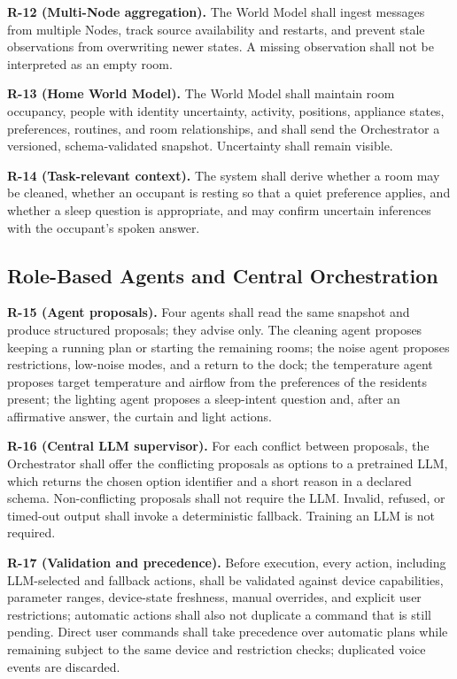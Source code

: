 \documentclass[conference]{IEEEtran}
\begin{document}
\textbf{R-12 (Multi-Node aggregation).}
The World Model shall ingest messages from multiple Nodes, track
source availability and restarts, and prevent stale observations
from overwriting newer states. A missing observation shall not be
interpreted as an empty room.

\textbf{R-13 (Home World Model).}
The World Model shall maintain room occupancy, people with
identity uncertainty, activity, positions, appliance states,
preferences, routines, and room relationships, and shall send the
Orchestrator a versioned, schema-validated snapshot. Uncertainty
shall remain visible.

\textbf{R-14 (Task-relevant context).}
The system shall derive whether a room may be cleaned, whether an
occupant is resting so that a quiet preference applies, and whether
a sleep question is appropriate, and may confirm uncertain
inferences with the occupant's spoken answer.

\subsection{Role-Based Agents and Central Orchestration}

\textbf{R-15 (Agent proposals).}
Four agents shall read the same snapshot and produce structured
proposals; they advise only. The cleaning agent proposes keeping a
running plan or starting the remaining rooms; the noise agent
proposes restrictions, low-noise modes, and a return to the dock;
the temperature agent proposes target temperature and airflow from
the preferences of the residents present; the lighting agent
proposes a sleep-intent question and, after an affirmative answer,
the curtain and light actions.

\textbf{R-16 (Central LLM supervisor).}
For each conflict between proposals, the Orchestrator shall offer
the conflicting proposals as options to a pretrained LLM, which
returns the chosen option identifier and a short reason in a
declared schema. Non-conflicting proposals shall not require the
LLM. Invalid, refused, or timed-out output shall invoke a
deterministic fallback. Training an LLM is not required.

\textbf{R-17 (Validation and precedence).}
Before execution, every action, including LLM-selected and
fallback actions, shall be validated against device capabilities,
parameter ranges, device-state freshness, manual overrides, and
explicit user restrictions; automatic actions shall also not
duplicate a command that is still pending. Direct user commands
shall take precedence over automatic plans while remaining subject
to the same device and restriction checks; duplicated voice events
are discarded.
\end{document}
